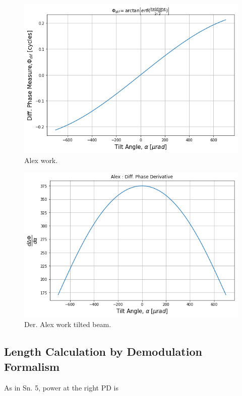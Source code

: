 \documentclass[aps,twoside,secnumarabic,balancelastpage,amsmath,amssymb,nofootinbib,hyperref=pdftex]{revtex4}
\begin{document}
\begin{figure}
	\centering
		\includegraphics[scale=.65]{tilt-al}
		\caption{Alex work.}
		\label{fig:7}
\end{figure}



\begin{figure}
	\centering
		\includegraphics[scale=.65]{tilt-al-der}
		\caption{Der. Alex work tilted beam.}
		\label{fig:8}
\end{figure}

\clearpage

\subsection{Length Calculation by Demodulation Formalism}

As in Sn. 5, power at the right PD is
\end{document}
